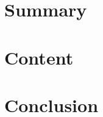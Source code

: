 \documentclass[11pt]{article}
\begin{document}
\maketitle

\section{Summary}
\lipsum

\section{Content}
\lipsum

\section{Conclusion}
\lipsum
\end{document}
